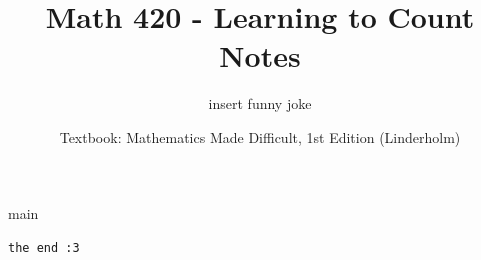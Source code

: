 \documentclass[12pt]{article}
\title{\Huge Math 420 - Learning to Count \\ Notes}
\author{insert funny joke}
\date{\normalsize Textbook: Mathematics Made Difficult, 1st Edition (Linderholm)}
\begin{document}
\maketitle
\clearpage


\tableofcontents

{main}



\clearpage
\vspace*{\fill}
\begin{center}
    {\Huge\verb|the end :3|}
\end{center}
\vspace*{\fill}
\end{document}
